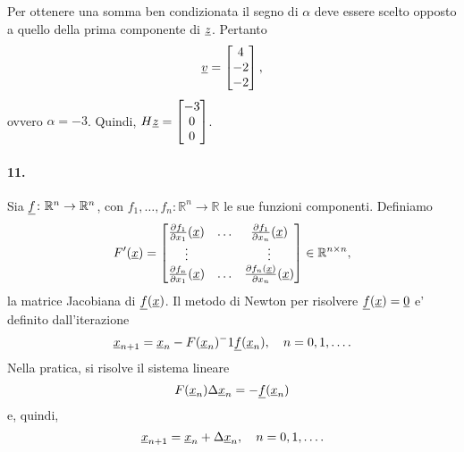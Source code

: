 Per ottenere una somma ben condizionata il segno di $\alpha$ deve essere scelto opposto a quello della prima componente di $\uline z$. Pertanto
\begin{equation*}
	\uline v = 
	\begin{bmatrix}
		4\\
		-2\\
		-2
	\end{bmatrix},
\end{equation*}
ovvero $\alpha = -3$. Quindi, $H\uline z =
\begin{bmatrix}
	-3\\
	0\\
	0
\end{bmatrix}$.

\paragraph{11.} Sia $\uline f\colon\mathbb{R}^n\rightarrow \mathbb{R}^n$, con $f_1,\hdots, f_n\colon\mathbb{R}^n\rightarrow\mathbb{R}$ le sue funzioni componenti. Definiamo
\begin{equation*}
	F'(\uline x)=
	\begin{bmatrix}
		\frac{\partial f_1}{\partial x_1}(\uline x) & \hdots & \frac{\partial f_1}{\partial x_n}(\uline x)\\
		\vdots & &\vdots\\
		\frac{\partial f_n}{\partial x_1}(\uline x) & \hdots & \frac{\partial f_n(\uline x)}{\partial x_n}(\uline x)
	\end{bmatrix}\in\mathbb R^{n\times n},
\end{equation*}
la matrice Jacobiana di $\uline f(\uline x)$. Il metodo di Newton per risolvere $\uline f(\uline x)=\uline 0$ e' definito dall'iterazione
\begin{equation*}
	\uline x_{n+1} = \uline x_n - F(\uline x_n)^-1\uline f(\uline x_n),\quad n=0,1,\hdots.
\end{equation*}
Nella pratica, si risolve il sistema lineare
\begin{equation*}
	F(\uline x_n)\Delta\uline x_n = -\uline f(\uline x_n)
\end{equation*}
e, quindi,
\begin{equation*}
	\uline x_{n+1} = \uline x_n + \Delta \uline x_n,\quad n = 0, 1, \hdots.
\end{equation*}